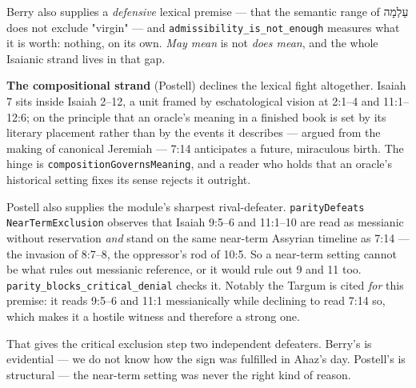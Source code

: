 \documentclass[11pt]{article}
\begin{document}
Berry also supplies a \emph{defensive} lexical premise — that the semantic range of עַלְמָה does not exclude "virgin" — and \texttt{admissibility\_\allowbreak{}is\_\allowbreak{}not\_\allowbreak{}enough} measures what it is worth: nothing, on its own. \emph{May mean} is not \emph{does mean}, and the whole Isaianic strand lives in that gap.

\textbf{The compositional strand} (Postell) declines the lexical fight altogether. Isaiah 7 sits inside Isaiah 2–12, a unit framed by eschatological vision at 2:1–4 and 11:1–12:6; on the principle that an oracle's meaning in a finished book is set by its literary placement rather than by the events it describes — argued from the making of canonical Jeremiah — 7:14 anticipates a future, miraculous birth. The hinge is \texttt{composition\allowbreak{}Governs\allowbreak{}Meaning}, and a reader who holds that an oracle's historical setting fixes its sense rejects it outright.

Postell also supplies the module's sharpest rival-defeater. \texttt{parity\allowbreak{}Defeats} \texttt{Near\allowbreak{}Term\allowbreak{}Exclusion} observes that Isaiah 9:5–6 and 11:1–10 are read as messianic without reservation \emph{and} stand on the same near-term Assyrian timeline as 7:14 — the invasion of 8:7–8, the oppressor's rod of 10:5. So a near-term setting cannot be what rules out messianic reference, or it would rule out 9 and 11 too. \texttt{parity\_\allowbreak{}blocks\_\allowbreak{}critical\_\allowbreak{}denial} checks it. Notably the Targum is cited \emph{for} this premise: it reads 9:5–6 and 11:1 messianically while declining to read 7:14 so, which makes it a hostile witness and therefore a strong one.

That gives the critical exclusion step two independent defeaters. Berry's is evidential — we do not know how the sign was fulfilled in Ahaz's day. Postell's is structural — the near-term setting was never the right kind of reason.
\end{document}
